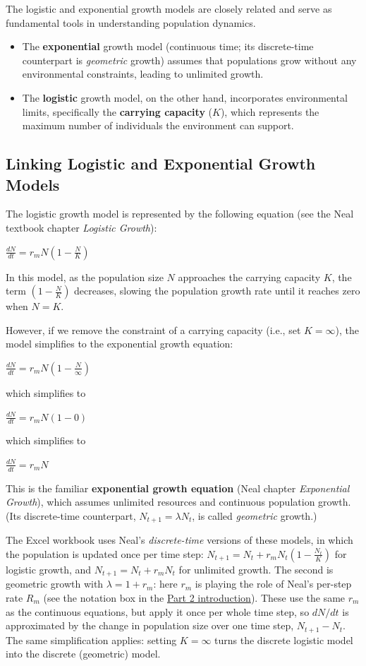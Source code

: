 \documentclass[
  a4paper]{book}
\providecommand{\tightlist}{%
  \setlength{\itemsep}{0pt}\setlength{\parskip}{0pt}}
\begin{document}
The logistic and exponential growth models are closely related and serve as fundamental tools in understanding population dynamics.

\begin{itemize}
\tightlist
\item
  The \textbf{exponential} growth model (continuous time; its discrete-time counterpart is \emph{geometric} growth) assumes that populations grow without any environmental constraints, leading to unlimited growth.
\item
  The \textbf{logistic} growth model, on the other hand, incorporates environmental limits, specifically the \textbf{carrying capacity} (\(K\)), which represents the maximum number of individuals the environment can support.
\end{itemize}

\subsection{Linking Logistic and Exponential Growth Models}\label{linking-logistic-and-exponential-growth-models}

The logistic growth model is represented by the following equation (see the Neal textbook chapter \emph{Logistic Growth}):

\(\frac{dN}{dt}=r_m N\left(1-\frac{N}{K}\right)\)

In this model, as the population size \(N\) approaches the carrying capacity \(K\), the term \(\left(1 - \frac{N}{K}\right)\) decreases, slowing the population growth rate until it reaches zero when \(N = K\).

However, if we remove the constraint of a carrying capacity (i.e., set \(K = \infty\)), the model simplifies to the exponential growth equation:

\(\frac{dN}{dt}=r_m N\left(1-\frac{N}{\infty}\right)\)

which simplifies to

\(\frac{dN}{dt}=r_m N\left(1-0\right)\)

which simplifies to

\(\frac{dN}{dt}= r_m N\)

This is the familiar \textbf{exponential growth equation} (Neal chapter \emph{Exponential Growth}), which assumes unlimited resources and continuous population growth. (Its discrete-time counterpart, \(N_{t+1} = \lambda N_t\), is called \emph{geometric} growth.)

The Excel workbook uses Neal's \emph{discrete-time} versions of these models, in which the population is updated once per time step: \(N_{t+1} = N_{t} + r_{m} N_{t}\left(1 - \frac{N_{t}}{K}\right)\) for logistic growth, and \(N_{t+1} = N_{t} + r_{m} N_{t}\) for unlimited growth. The second is geometric growth with \(\lambda = 1 + r_m\): here \(r_m\) is playing the role of Neal's per-step rate \(R_m\) (see the notation box in the \hyperref[part-2]{Part 2 introduction}). These use the same \(r_m\) as the continuous equations, but apply it once per whole time step, so \(dN/dt\) is approximated by the change in population size over one time step, \(N_{t+1} - N_{t}\). The same simplification applies: setting \(K = \infty\) turns the discrete logistic model into the discrete (geometric) model.
\end{document}
